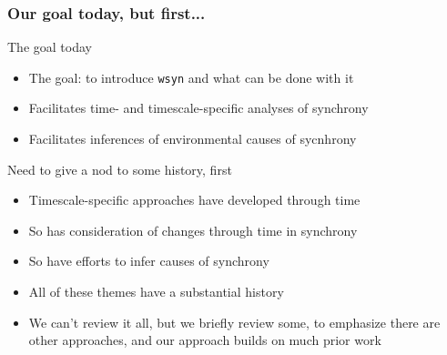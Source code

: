 \documentclass{beamer}
\begin{document}
\begin{frame}
\frametitle{Our goal today, but first...}
\begin{block}{The goal today}
\begin{itemize}
\item The goal: to introduce \texttt{wsyn} and what can be done with it
\item Facilitates time- and timescale-specific analyses of synchrony
\item Facilitates inferences of environmental causes of sycnhrony 
\end{itemize}
\end{block}
\begin{block}{Need to give a nod to some history, first}
\begin{itemize}
\item Timescale-specific approaches have developed through time
\item So has consideration of changes through time in synchrony
\item So have efforts to infer causes of synchrony
\item All of these themes have a substantial history
\item We can't review it all, but we briefly review some, to emphasize there are other approaches, and our approach builds on much prior work
\end{itemize}
\end{block}
\end{frame}
\end{document}
